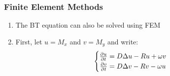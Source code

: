 \begin{frame}
\frametitle{Finite Element Methods}
\begin{enumerate}
    \item The BT equation can also be solved using FEM
    \pause
    \item First, let $u=M_x$ and $v=M_y$ and write:%
    \begin{equation*}
    \begin{cases}
        \pd{u}{t} = D \Laplacian{u} - R u + \omega v\\%
        \hspace{0.5pt}\pd{v}{t} = D \Laplacian{v} - R v - \omega u\\%
    \end{cases}
    \end{equation*}
\end{enumerate}
\end{frame}

